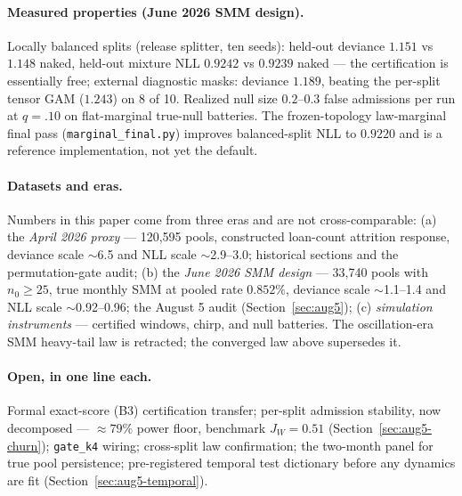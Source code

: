\documentclass[11pt]{article}
\begin{document}
\paragraph{Measured properties (June 2026 SMM design).}
Locally balanced splits (release splitter, ten seeds): held-out deviance
$1.151$ vs $1.148$ naked, held-out mixture NLL $0.9242$ vs $0.9239$ naked ---
the certification is essentially free; external diagnostic masks: deviance
$1.189$, beating the per-split tensor GAM ($1.243$) on 8 of 10. Realized null
size $0.2$--$0.3$ false admissions per run at $q{=}.10$ on flat-marginal
true-null batteries. The frozen-topology law-marginal final pass
(\texttt{marginal\_final.py}) improves balanced-split NLL to $0.9220$ and is a
reference implementation, not yet the default.

\paragraph{Datasets and eras.} Numbers in this paper come from three eras and
are not cross-comparable: (a) the \emph{April 2026 proxy} --- 120{,}595
pools, constructed loan-count attrition response, deviance scale $\sim$6.5
and NLL scale $\sim$2.9--3.0; historical sections and the permutation-gate
audit; (b) the \emph{June 2026 SMM design} --- 33{,}740 pools with
$n_0\ge25$, true monthly SMM at pooled rate $0.852\%$, deviance scale
$\sim$1.1--1.4 and NLL scale $\sim$0.92--0.96; the August 5 audit
(Section~\ref{sec:aug5}); (c) \emph{simulation instruments} --- certified
windows, chirp, and null batteries. The oscillation-era SMM heavy-tail law is
retracted; the converged law above supersedes it.

\paragraph{Open, in one line each.} Formal exact-score (B3) certification
transfer; per-split admission stability, now decomposed --- $\approx79\%$ power floor,
benchmark $J_W=0.51$ (Section~\ref{sec:aug5-churn}); \texttt{gate\_k4} wiring; cross-split law confirmation;
the two-month panel for true pool persistence; pre-registered temporal test
dictionary before any dynamics are fit (Section~\ref{sec:aug5-temporal}).
\end{document}
